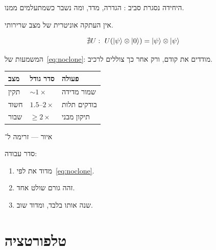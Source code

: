 היחידה נסגרת סביב : הגדרה, מדד, ומה נשבר כשמתעלמים ממנו.

\begin{thmbox}[frametitle={משפט — אי־שכפול}]
אין העתקה אוניטרית של מצב שרירותי.
\end{thmbox}

\begin{equation}
\label{eq:noclone}
\nexists U:\ U(\ket\psi\otimes\ket0)=\ket\psi\otimes\ket\psi
\end{equation}

המשמעות של~\eqref{eq:noclone}: מודדים את  קודם, ורק אחר כך צוללים לרכיב.

\begin{tablebox}\centering\small
\begin{tabular}{@{}lll@{}}
\toprule
\textbf{מצב} & \textbf{סדר גודל} & \textbf{פעולה}\\
\midrule
תקין & $\sim 1\times$ & שמור מדידה\\
חשוד & $1.5$–$2\times$ & בודקים תלות\\
שבור & $\ge 2\times$ & תיקון מבני\\
\bottomrule
\end{tabular}
\end{tablebox}

\begin{tikzpic}
\end{tikzpic}
\begin{center}\small איור — זרימה ל־\end{center}

סדר עבודה:
\begin{enumerate}
\item[(\textbf{א})] מדוד את  לפי~\eqref{eq:noclone}.
\item[(\textbf{ב})] זהה גורם שולט אחד.
\item[(\textbf{ג})] שנה אותו בלבד, ומדוד שוב.
\end{enumerate}

\chapter{טלפורטציה}
\label{ch:teleport}

